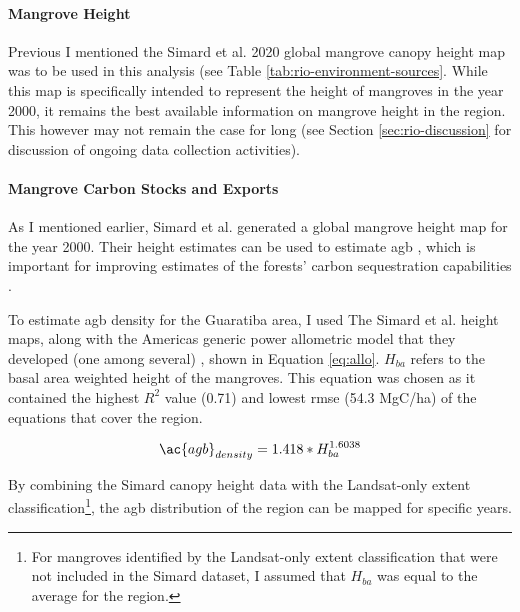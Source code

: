 \paragraph{Mangrove Height} \label{sec:rio-mangrove-height} \leavevmode\newline

Previous I mentioned the Simard et al. 2020 global mangrove canopy height map was to be used in this analysis (see Table \ref{tab:rio-environment-sources}. While this map is specifically intended to represent the height of mangroves in the year 2000, it remains the best available information on mangrove height in the region. This however may not remain the case for long (see Section \ref{sec:rio-discussion} for discussion of ongoing data collection activities).

\paragraph{Mangrove Carbon Stocks and Exports} \label{sec:rio-mangrove-carbon} \leavevmode\newline

As I mentioned earlier, Simard et al. generated a global mangrove height map for the year 2000. Their height estimates can be used to estimate \ac{agb} \cite{cloughAllometricRelationshipsEstimating1989, fatoyinboEstimatingMangroveAboveground2018}, which is important for improving estimates of the forests' carbon sequestration capabilities \cite{lagomasinoMeasuringMangroveCarbon2019, simardMangroveCanopyHeight2019}.

To estimate \ac{agb} density for the Guaratiba area, I used The Simard et al. height maps, along with the Americas generic power allometric model that they developed (one among several) \cite{simardMangroveCanopyHeight2019}, shown in Equation \ref{eq:allo}. $H_{ba}$ refers to the basal area weighted height of the mangroves. This equation was chosen as it contained the highest $R^2$ value (0.71) and lowest \ac{rmse} (54.3 MgC/ha) of the equations that cover the region. 

\begin{equation}
\label{eq:allo}
\ac{agb}_{density} = 1.418 * H_{ba}^{1.6038}
\end{equation}

By combining the Simard canopy height data with the Landsat-only extent classification\footnote{For mangroves identified by the Landsat-only extent classification that were not included in the Simard dataset, I assumed that $H_{ba}$ was equal to the average for the region.}, the \ac{agb} distribution of the region can be mapped for specific years.

